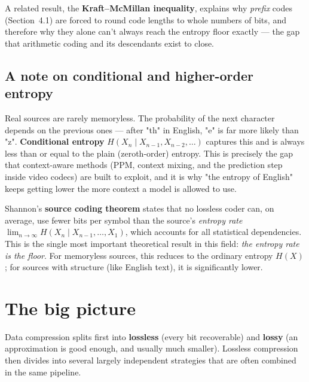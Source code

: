 \documentclass[11pt]{article}
\begin{document}
A related result, the \textbf{Kraft--McMillan inequality}, explains why \emph{prefix} codes (Section~4.1) are forced to round code lengths to whole numbers of bits, and therefore why they alone can't always reach the entropy floor exactly — the gap that arithmetic coding and its descendants exist to close.

\subsection{A note on conditional and higher-order entropy}

Real sources are rarely memoryless. The probability of the next character depends on the previous ones — after "th" in English, "e" is far more likely than "z". \textbf{Conditional entropy} $H(X_n \mid X_{n-1}, X_{n-2}, \ldots)$ captures this and is always less than or equal to the plain (zeroth-order) entropy. This is precisely the gap that context-aware methods (PPM, context mixing, and the prediction step inside video codecs) are built to exploit, and it is why "the entropy of English" keeps getting lower the more context a model is allowed to use.

Shannon's \textbf{source coding theorem} states that no lossless coder can, on average, use fewer bits per symbol than the source's \emph{entropy rate} $\lim_{n\to\infty} H(X_n \mid X_{n-1}, \ldots, X_1)$, which accounts for all statistical dependencies. This is the single most important theoretical result in this field: \emph{the entropy rate is the floor}. For memoryless sources, this reduces to the ordinary entropy $H(X)$; for sources with structure (like English text), it is significantly lower.


\section{The big picture}

Data compression splits first into \textbf{lossless} (every bit recoverable) and \textbf{lossy} (an approximation is good enough, and usually much smaller). Lossless compression then divides into several largely independent strategies that are often combined in the same pipeline.
\end{document}
